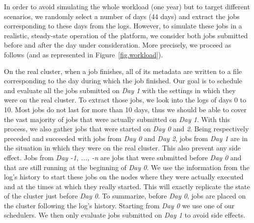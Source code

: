 \documentclass[conference,10pt]{IEEEtran}
\begin{document}
In order to avoid simulating the whole workload (one year) but to
target different scenarios, we randomly select a number of days (44 days) and
extract the jobs corresponding to these days from the logs. However,
to simulate these jobs in a realistic, steady-state operation of the
platform, we consider both jobs submitted before and after the day
under consideration. More precisely, we proceed as follows (and as
represented in Figure~\ref{fig.workload}).


On the real cluster, when a job finishes, all of its metadata
are written to a file corresponding to the day during which the job finished.
Our goal is to schedule and evaluate all the jobs submitted on 
\textit{Day 1} with the settings in which they were on the real cluster.
To extract those jobs, we
look into the logs of days 0 to 10. Most jobs do not last for more than 10 days,
thus we should be able to cover the vast majority of jobs that were actually submitted on 
\textit{Day 1}.
With this process, we also gather jobs that were started on \textit{Day 0} and \textit{2}. 
Being respectively preceded and succeeded with jobs from \textit{Day 0}
and \textit{Day 2}, jobs from \textit{Day 1} are in
the situation in which they were on the real cluster.
This also prevent any side effect.
Jobs from \textit{Day -1, ..., -n} are jobs that were submitted before \textit{Day 0} and that are still running at the beginning of \textit{Day 0}.
We use the information from the log's history to start these jobs on the nodes
where they were actually executed and at the times at which they really started.
This will exactly replicate the state of the cluster just before \textit{Day 0}.
To summarize, before \textit{Day 0}, jobs are placed on the cluster
following the log's history. Starting from \textit{Day 0} we 
use one of our schedulers. We then only evaluate jobs submitted on \textit{Day 1}
to avoid side effects.
\end{document}
